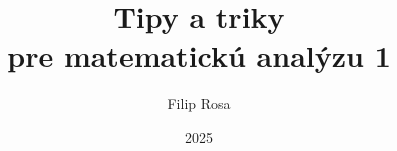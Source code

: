 \documentclass[12pt, a4paper]{article}
\title {\Huge \textbf {Tipy a triky \\ pre matematickú analýzu 1}}
\author{Filip Rosa}
\date{2025}
\begin{document}
\begin{titlepage}
    \centering
    \vfill
    \maketitle
    \vfill
\end{titlepage}

\cleardoublepage

\renewcommand{\contentsname}{Obsah}

\tableofcontents

\newpage



\newpage


\end{document}
